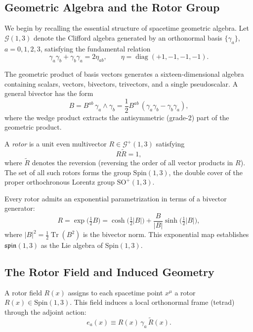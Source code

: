 \documentclass[11pt,a4paper]{article}
\numberwithin{equation}{section}
\theoremstyle{plain}
\theoremstyle{definition}
\theoremstyle{remark}
\DeclareMathOperator{\Tr}{Tr}
\DeclareMathOperator{\diag}{diag}
\begin{document}
\subsection{Geometric Algebra and the Rotor Group}

We begin by recalling the essential structure of spacetime geometric algebra. Let $\mathcal{G}(1,3)$ denote the Clifford algebra generated by an orthonormal basis $\{\gamma_a\}$, $a=0,1,2,3$, satisfying the fundamental relation
\begin{equation}
\gamma_a\gamma_b+\gamma_b\gamma_a=2\eta_{ab}, \qquad \eta=\diag(+1,-1,-1,-1).
\end{equation}

The geometric product of basis vectors generates a sixteen-dimensional algebra containing scalars, vectors, bivectors, trivectors, and a single pseudoscalar. A general bivector has the form
\begin{equation}
B = B^{ab}\,\gamma_a\wedge\gamma_b = \frac{1}{2}B^{ab}\,(\gamma_a\gamma_b - \gamma_b\gamma_a),
\end{equation}
where the wedge product extracts the antisymmetric (grade-2) part of the geometric product.

A \emph{rotor} is a unit even multivector $R \in \mathcal{G}^+(1,3)$ satisfying
\begin{equation}
R\widetilde{R} = 1,
\end{equation}
where $\widetilde{R}$ denotes the reversion (reversing the order of all vector products in $R$). The set of all such rotors forms the group $\mathrm{Spin}(1,3)$, the double cover of the proper orthochronous Lorentz group $\mathrm{SO}^+(1,3)$.

Every rotor admits an exponential parametrization in terms of a bivector generator:
\begin{equation}
R = \exp\!\big(\tfrac{1}{2}B\big) = \cosh\!\big(\tfrac{1}{2}|B|\big) + \frac{B}{|B|}\sinh\!\big(\tfrac{1}{2}|B|\big),
\end{equation}
where $|B|^2 = \frac{1}{2}\Tr(B^2)$ is the bivector norm. This exponential map establishes $\mathfrak{spin}(1,3)$ as the Lie algebra of $\mathrm{Spin}(1,3)$.

\subsection{The Rotor Field and Induced Geometry}

A rotor field $R(x)$ assigns to each spacetime point $x^\mu$ a rotor $R(x) \in \mathrm{Spin}(1,3)$. This field induces a local orthonormal frame (tetrad) through the adjoint action:
\begin{equation}
e_a(x) \equiv R(x)\, \gamma_a\, \widetilde{R}(x).
\label{eq:tetrad-def}
\end{equation}
\end{document}
